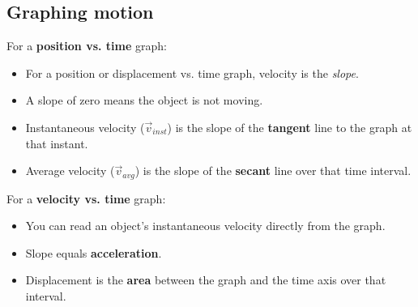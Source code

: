 \subsection{Graphing motion}
For a \textbf{position vs. time} graph:
\begin{itemize}
\item For a position or displacement vs. time graph, velocity is the \textit{slope}.
\item A slope of zero means the object is not moving.
\item Instantaneous velocity ($\vec{v}_{inst}$) is the slope of the \textbf{tangent} line to the graph at that instant.
\item Average velocity ($\vec{v}_{avg}$) is the slope of the \textbf{secant} line over that time interval.
\end{itemize}
For a \textbf{velocity vs. time} graph:
\begin{itemize}
    \item You can read an object's instantaneous velocity directly from the graph.
    \item Slope equals \textbf{acceleration}.
    \item Displacement is the \textbf{area} between the graph and the time axis over that interval.
\end{itemize}
